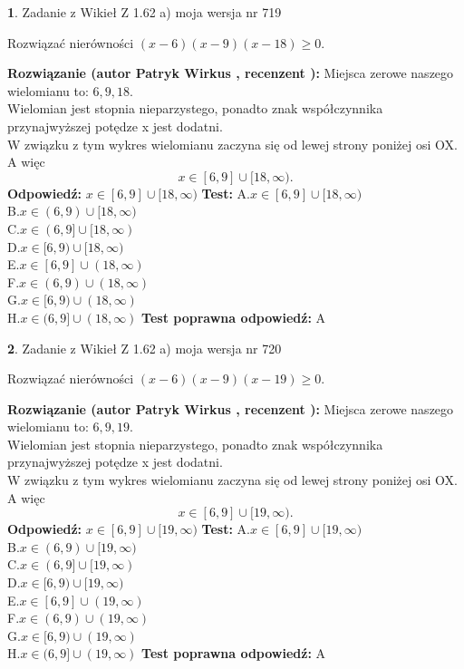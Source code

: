 \documentclass[12pt, a4paper]{article}
\theoremstyle{definition} %
\newtheorem{zad}{}
\newcommand{\zadStart}[1]{\begin{zad}#1\newline}
\newcommand{\zadStop}{\end{zad}}
\newcommand{\rozwStart}[2]{\noindent \textbf{Rozwiązanie (autor #1 , recenzent #2): }\newline}
\newcommand{\rozwStop}{\newline}
\newcommand{\odpStart}{\noindent \textbf{Odpowiedź:}\newline}
\newcommand{\odpStop}{\newline}
\newcommand{\testStart}{\noindent \textbf{Test:}\newline}
\newcommand{\testStop}{\newline}
\newcommand{\kluczStart}{\noindent \textbf{Test poprawna odpowiedź:}\newline}
\newcommand{\kluczStop}{\newline}
\begin{document}
\zadStart{Zadanie z Wikieł Z 1.62 a) moja wersja nr 719}

Rozwiązać nierówności $(x-6)(x-9)(x-18)\ge0$.
\zadStop
\rozwStart{Patryk Wirkus}{}
Miejsca zerowe naszego wielomianu to: $6, 9, 18$.\\
Wielomian jest stopnia nieparzystego, ponadto znak współczynnika przy\linebreak najwyższej potędze x jest dodatni.\\ W związku z tym wykres wielomianu zaczyna się od lewej strony poniżej osi OX. A więc $$x \in [6,9] \cup [18,\infty).$$
\rozwStop
\odpStart
$x \in [6,9] \cup [18,\infty)$
\odpStop
\testStart
A.$x \in [6,9] \cup [18,\infty)$\\
B.$x \in (6,9) \cup [18,\infty)$\\
C.$x \in (6,9] \cup [18,\infty)$\\
D.$x \in [6,9) \cup [18,\infty)$\\
E.$x \in [6,9] \cup (18,\infty)$\\
F.$x \in (6,9) \cup (18,\infty)$\\
G.$x \in [6,9) \cup (18,\infty)$\\
H.$x \in (6,9] \cup (18,\infty)$
\testStop
\kluczStart
A
\kluczStop



\zadStart{Zadanie z Wikieł Z 1.62 a) moja wersja nr 720}

Rozwiązać nierówności $(x-6)(x-9)(x-19)\ge0$.
\zadStop
\rozwStart{Patryk Wirkus}{}
Miejsca zerowe naszego wielomianu to: $6, 9, 19$.\\
Wielomian jest stopnia nieparzystego, ponadto znak współczynnika przy\linebreak najwyższej potędze x jest dodatni.\\ W związku z tym wykres wielomianu zaczyna się od lewej strony poniżej osi OX. A więc $$x \in [6,9] \cup [19,\infty).$$
\rozwStop
\odpStart
$x \in [6,9] \cup [19,\infty)$
\odpStop
\testStart
A.$x \in [6,9] \cup [19,\infty)$\\
B.$x \in (6,9) \cup [19,\infty)$\\
C.$x \in (6,9] \cup [19,\infty)$\\
D.$x \in [6,9) \cup [19,\infty)$\\
E.$x \in [6,9] \cup (19,\infty)$\\
F.$x \in (6,9) \cup (19,\infty)$\\
G.$x \in [6,9) \cup (19,\infty)$\\
H.$x \in (6,9] \cup (19,\infty)$
\testStop
\kluczStart
A
\kluczStop
\end{document}
